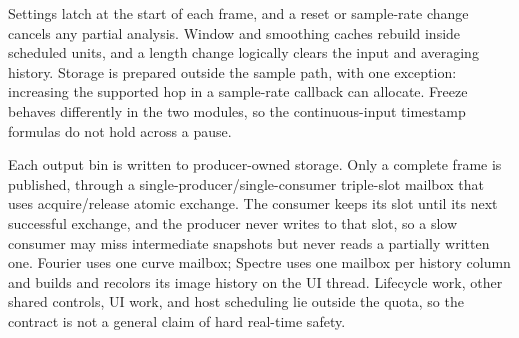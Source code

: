 Settings latch at the start of each frame, and a reset or sample-rate change
cancels any partial analysis. Window and smoothing caches rebuild inside
scheduled units, and a length change logically clears the input and averaging
history. Storage is prepared outside the sample path, with one exception:
increasing the supported hop in a sample-rate callback can allocate. Freeze
behaves differently in the two modules, so the continuous-input timestamp
formulas do not hold across a pause.

Each output bin is written to producer-owned storage. Only a complete frame is
published, through a single-producer/single-consumer triple-slot mailbox that
uses acquire/release atomic exchange. The consumer keeps its slot until its
next successful exchange, and the producer never writes to that slot, so a
slow consumer may miss intermediate snapshots but never reads a partially
written one. Fourier uses one curve mailbox; Spectre uses one mailbox per
history column and builds and recolors its image history on the UI thread.
Lifecycle work, other shared controls, UI work, and host scheduling lie
outside the quota, so the contract is not a general claim of hard real-time
safety.
